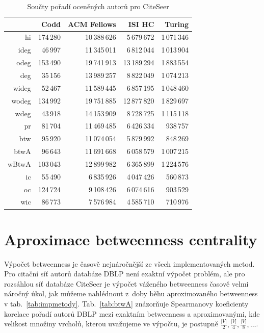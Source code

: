 \documentclass{bakalarka}
\begin{document}
\begin{table}[!ht]
\centering
\caption{Součty pořadí oceněných autorů pro CiteSeer}
\label{tab:oceneni2}
\begin{tabular}{r|rrrr}
\toprule
&Codd & ACM Fellows & ISI HC  & Turing \\
\midrule
hi   &174\,280&10\,388\,626& 5\,679\,672&1\,071\,346 \\
ideg & 46\,997&11\,345\,011& 6\,812\,044&1\,013\,904 \\
odeg &153\,490&19\,741\,913&13\,189\,294&1\,883\,554 \\
deg  & 35\,156&13\,989\,257& 8\,822\,049&1\,074\,213 \\
wideg& 52\,467&11\,589\,445& 6\,857\,195&1\,048\,460 \\
wodeg&134\,992&19\,751\,885&12\,877\,820&1\,829\,697\\
wdeg & 43\,918&14\,153\,909& 8\,728\,725&1\,115\,118\\
pr   & 81\,704&11\,469\,485& 6\,426\,334&   938\,757\\
btw  & 95\,920&11\,074\,054& 5\,879\,992&   848\,269\\
btwA & 96\,643&11\,691\,668& 6\,058\,579&1\,007\,215\\
wBtwA&103\,043&12\,899\,982& 6\,365\,899&1\,224\,576\\
\midrule
ic\footnotemark[1]  &55\,490 &6\,835\,926&4\,047\,426&560\,873\\
oc\footnotemark[1]  &124\,724&9\,108\,426&6\,074\,616&903\,529\\
wic\footnotemark[1] &86\,773 &7\,576\,984&4\,585\,710&710\,976\\
\bottomrule
\end{tabular}
\end{table}


\clearpage
\section{Aproximace betweenness centrality}
Výpočet betweenness je časově nejnáročnější ze všech implementovaných metod.
Pro citační síť autorů databáze DBLP není exaktní výpočet problém, ale pro
rozsáhlou síť databáze CiteSeer je výpočet váženého betweenness časově velmi
náročný úkol, jak můžeme nahlédnout z~doby běhu aproximovaného betweenness v
tab.~\ref{tab:impmetody}. Tab.~\ref{tab:btwA} znázorňuje Spearmanovy
koeficienty korelace pořadí autorů DBLP mezi exaktním betweenness a
aproximovanými, kde velikost množiny vrcholů, kterou uvažujeme ve výpočtu, je
postupně $\frac{|V|}{2}, \frac{|V|}{4}, \frac{|V|}{8}, \ldots$.
\end{document}
